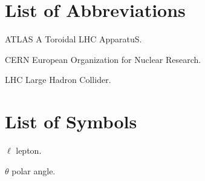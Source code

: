 \chapter{List of Abbreviations}

\begin{symbollist*}
\item[ATLAS] A Toroidal LHC ApparatuS.
\item[CERN] European Organization for Nuclear Research.
\item[LHC] Large Hadron Collider.
\end{symbollist*}

\def\met{\ensuremath{E_{\mathrm{T}}^{\mathrm{miss}}}}


\chapter{List of Symbols}

\begin{symbollist}[0.7in]
    \item[$\ell$] lepton.
    \item[$\theta$] polar angle.
\end{symbollist}
